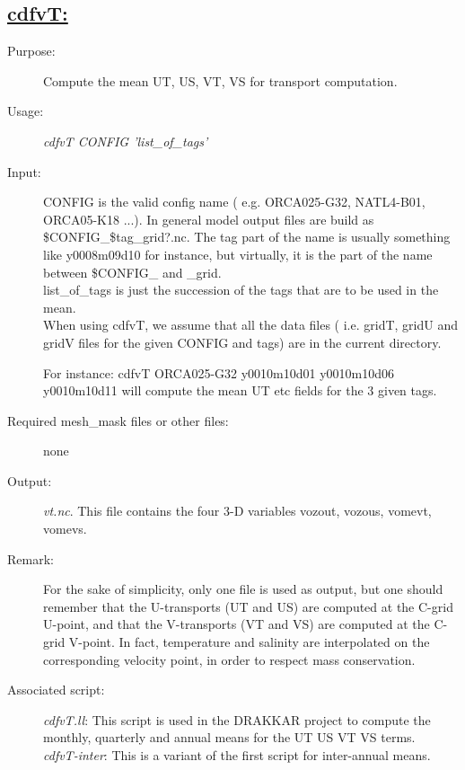 \documentclass[a4paper,11pt]{article}
\begin{document}
\subsection*{\underline{cdfvT:}}
\begin{description}
\item[Purpose:] Compute the mean UT, US, VT, VS for transport computation.
\item[Usage:] {\em cdfvT CONFIG 'list\_of\_tags' }
\item[Input:] CONFIG is the valid config name ( e.g. ORCA025-G32, NATL4-B01, ORCA05-K18 ...). In general
model output files are build as \$CONFIG\_\$tag\_grid?.nc. The tag part of the name is usually something like
y0008m09d10 for instance, but virtually, it is the part of the name between \$CONFIG\_ and \_grid.\\
list\_of\_tags is just the succession of the tags that are to be used in the mean. \\
When using cdfvT, we assume that all the data files ( i.e. gridT, gridU and gridV files for the given CONFIG and
tags) are in the current directory. 

For instance: cdfvT ORCA025-G32 y0010m10d01 y0010m10d06 y0010m10d11 will compute the mean UT etc fields for the 3
given tags.
\item[Required mesh\_mask files or other files:]  none
\item[Output:] {\em vt.nc}. This file contains the four  3-D variables vozout, vozous, vomevt, vomevs. 
\item[Remark:] For the sake of simplicity, only one file is used as output, but one should remember that
the U-transports (UT and US) are computed at the C-grid U-point, and that the V-transports (VT and VS) are
 computed at the C-grid V-point. In fact, temperature and salinity are interpolated on the corresponding
velocity point, in order to respect  mass conservation.
\item[Associated script:] {\em cdfvT.ll}: This script is used in the DRAKKAR project to compute the monthly, quarterly and
annual means for the UT US VT VS terms.\\
{\em cdfvT-inter}: This is a variant of the first script for inter-annual means.
\end{description}
\end{document}
